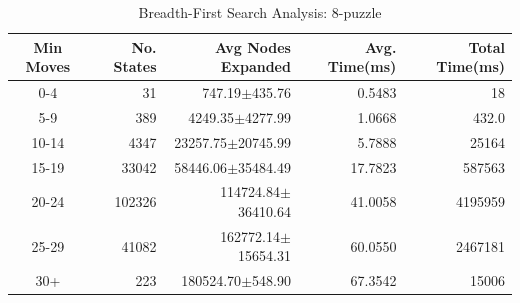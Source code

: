 \documentclass[final]{cmpreport}
\begin{document}
\begin{table}[ht]
	\caption{Breadth-First Search Analysis: 8-puzzle}
	\label{table:kysymys}
	\begin{center}
		\begin{tabular}{crrrr} \hline
			Min Moves & No. States & Avg Nodes Expanded & Avg. Time(ms) & Total Time(ms) \\ \hline
			0-4  & 31 & 747.19$\pm$435.76 & 0.5483 & 18 \\
			5-9 & 389 &4249.35$\pm$4277.99& 1.0668 & 432.0 \\ 
			10-14 & 4347 &  23257.75$\pm$20745.99& 5.7888 & 25164  \\ 
			15-19 & 33042& 58446.06$\pm$35484.49 & 17.7823 & 587563 \\ 
			20-24 & 102326& 114724.84$\pm$36410.64 & 41.0058 & 4195959  \\ 
			25-29 & 41082& 162772.14$\pm$15654.31 & 60.0550 & 2467181 \\ 
			30+ & 223& 180524.70$\pm$548.90 & 67.3542 & 15006\\ \hline
		\end{tabular}
	\end{center}

\end{table}
\end{document}
